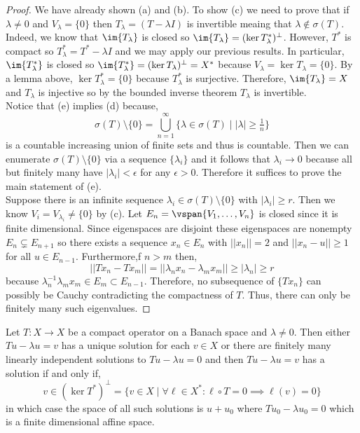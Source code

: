 \documentclass[12pt]{article}
\begin{document}
\begin{proof}
We have already shown (a) and (b). To show (c) we need to prove that if $\lambda \neq 0$ and $V_\lambda = \{ 0 \}$ then $T_\lambda = (T - \lambda I)$ is invertible meaing that $\lambda \notin \sigma(T)$. Indeed, we know that $\im{T_\lambda}$ is closed so $\im{T_\lambda} = (\ker{T^*_\lambda})^\perp$. However, $T^*$ is compact so $T^*_\lambda = T^* - \lambda I$ and we may apply our previous results. In particular, $\im{T^*_\lambda}$ is closed so $\im{T^*_\lambda} = (\ker{T_\lambda})^\perp = X^*$ because $V_\lambda = \ker{T_\lambda} = \{ 0 \}$. By a lemma above, $\ker{T^*_\lambda} = \{ 0 \}$ because $T^*_\lambda$ is surjective. Therefore, $\im{T_\lambda} = X$ and $T_\lambda$ is injective so by the bounded inverse theorem $T_\lambda$ is invertible.
\bigskip\\
Notice that (e) implies (d) because,
\[ \sigma(T) \setminus \{ 0 \} = \bigcup_{n = 1}^\infty \{ \lambda \in \sigma(T) \mid |\lambda| \ge \tfrac{1}{n} \} \] 
is a countable increasing union of finite sets and thus is countable. Then we can enumerate $\sigma(T) \setminus \{ 0 \}$ via a sequence $\{ \lambda_i \}$ and it follows that $\lambda_i \to 0$ because all but finitely many have $|\lambda_i| < \epsilon$ for any $\epsilon > 0$. Therefore it suffices to prove the main statement of (e).
\bigskip\\
Suppose there is an infinite sequence $\lambda_i \in \sigma(T) \setminus \{ 0 \}$ with $|\lambda_i| \ge r$. Then we know $V_i = V_{\lambda_i} \neq \{ 0 \}$ by (c). Let $E_n = \vspan{ V_1, \dots, V_n }$ is closed since it is finite dimensional. Since eigenspaces are disjoint these eigenspaces are nonempty $E_n \subsetneq E_{n+1}$ so there exists a sequence $x_n \in E_n$ with $|| x_n || = 2$ and $|| x_n - u || \ge 1$ for all $u \in E_{n-1}$. Furthermore,f $n > m$ then,
\[ || T x_n - T x_m || = || \lambda_n x_n - \lambda_m x_m || \ge |\lambda_n| \ge r \]
because $\lambda_n^{-1} \lambda_m x_m \in E_m \subset E_{n - 1}$. Therefore, no subsequence of $\{ T x_n \}$ can possibly be Cauchy contradicting the compactness of $T$. Thus, there can only be finitely many such eigenvalues.
\end{proof}

\begin{cor}
Let $T : X \to X$ be a compact operator on a Banach space and $\lambda \neq 0$. Then either $T u - \lambda u = v$ has a unique solution for each $v \in X$ or there are finitely many linearly independent solutions to $T u - \lambda u = 0$ and then $T u - \lambda u = v$ has a solution if and only if,
\[ v \in (\ker{T^*})^\perp = \{ v \in X \mid \forall \ell \in X^* : \ell \circ T = 0 \implies \ell(v) = 0 \} \]
in which case the space of all such solutions is $u + u_0$ where $T u_0 - \lambda u_0 = 0$ which is a finite dimensional affine space.
\end{cor}
\end{document}
